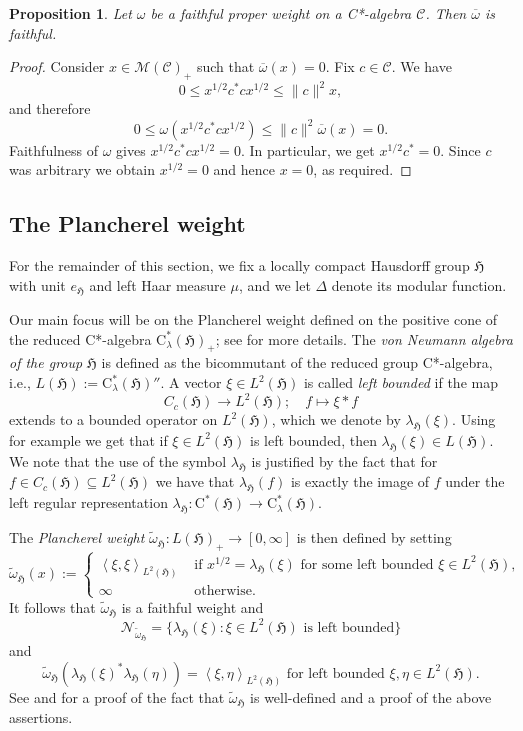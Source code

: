 \documentclass[11pt,final]{amsart}
\numberwithin{equation}{section}
\theoremstyle{plain}
\newtheorem{proposition}[theorem]{Proposition}
\theoremstyle{definition}
\theoremstyle{remark}
\newcommand{\C}{{\mathcal{C}}}
\newcommand{\M}{{\mathcal{M}}}
\newcommand{\N}{{\mathcal{N}}}
\def\De{\Delta}
\def\la{\lambda}
\def\om{\omega}
\newcommand{\fH}{{\mathfrak{H}}}
\newcommand{\ca}{\mathrm{C}^*}
\newcommand{\ol}{\overline}
\newcommand{\wt}{\widetilde}
\newcommand{\sca}[1]{\left\langle#1\right\rangle} %
\begin{document}
\begin{proposition}\label{P:faithext}
Let $\om$ be a faithful proper weight on a C*-algebra $\C$. Then $\ol{\om}$ is faithful.
\end{proposition}

\begin{proof}
Consider $x \in \M(\C)_+$ such that $\ol{\om}(x)=0$. Fix $c\in \C$.  We have
\[
 0\leq x^{1/2}c^* c x^{1/2}\leq \|c\|^2 x,
\]
and therefore
\[
 0\leq\om(x^{1/2}c^* cx^{1/2})
 \leq \|c\|^2 \ol{\om}(x)=0.
\]
Faithfulness of $\om$ gives $x^{1/2} c^*c x^{1/2}=0$. In particular, we get $x^{1/2} c^*=0$. Since $c$ was arbitrary we obtain $x^{1/2}=0$ and hence $x=0$, as required.
\end{proof}

\subsection{The Plancherel weight}

For the remainder of this section, we fix a locally compact Hausdorff group $\fH$ with unit $e_{\fH}$ and left Haar measure $\mu$, and we let $\De$ denote its modular function.

Our main focus will be on the Plancherel weight defined on the positive cone of the reduced C*-algebra $\ca_{\la}(\fH)_+$; see \cite[Section~VII.2 and VII.3]{Tak03}  for more details.
The \emph{von Neumann algebra of the group} $\fH$ is defined as the bicommutant of the reduced group C*-algebra, i.e., $L(\fH):= \ca_{\la}(\fH)''$.  A vector $\xi\in L^2(\fH)$ is called \emph{left bounded} if the map
\[
C_c(\fH) \to L^2(\fH); \quad f \mapsto \xi \ast f
\]
extends to a bounded operator on $L^2(\fH)$, which we denote by $\la_{\fH}(\xi)$. Using for example \cite[Proposition VII.3.1]{Tak03} we get that if $\xi \in L^2(\fH)$ is left bounded, then $\la_{\fH}(\xi)\in L(\fH)$. We note that the use of the symbol $\la_{\fH}$ is justified by the fact that for $f\in C_c(\fH)\subseteq L^2(\fH)$ we have that $\la_{\fH}(f)$ is exactly the image of $f$ under the left regular representation $\la_{\fH} \colon \ca(\fH) \to \ca_\la(\fH)$.

The \emph{Plancherel weight} $\wt{\om}_{\fH} \colon L(\fH)_+ \to [0,\infty]$ is then defined 
by setting
\[
\wt{\om}_{\fH}(x):= 
\begin{cases}
\sca{\xi,\xi}_{L^2(\fH)} & \text{ if } x^{1/2}=\la_{\fH}(\xi) \text{ for some left bounded } \xi \in L^2(\fH),\\
\infty & \text{ otherwise.}
\end{cases}
\]
It follows that $\wt{\om}_{\fH}$ is a faithful weight and
\[
\N_{\wt{\om}_{\fH}}=\{ \la_{\fH}(\xi): \xi \in L^2(\fH) \text{ is left bounded}\}
\]
and
\[
\wt{\om}_{\fH}(\la_{\fH}(\xi)^*\la_{\fH}(\eta))
=\sca{\xi,\eta}_{L^2(\fH)} \text{ for left bounded }  \xi,\eta\in L^2(\fH).
\]
See \cite[Theorem~VII.2.5]{Tak03} and \cite[Definition VII.3.2]{Tak03} for a proof of the fact that $\wt{\om}_{\fH}$ is well-defined and a proof of the above assertions.
\end{document}
